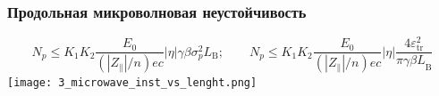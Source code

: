 \begin{frame}
	\frametitle{Продольная микроволновая неустойчивость}
	\begin{equation}
		N_p\le K_1K_2\frac{E_0}{\left(\left|Z_\parallel\right|/n\right)ec}\left|\eta\right|\gamma\beta\sigma_p^2L_{\textrm{B}};
		\quad \quad
		N_p\le K_1K_2\frac{E_0}{\left(\left|Z_\parallel\right|/n\right)ec}\left|\eta\right|\frac{4\varepsilon_{\text{tr}}^2}{{\pi\gamma\beta L}_{\textrm{B}}}
		\label{eq:microwave_instability_2}
	\end{equation}
	\centering
	\texttt{[image: 3\_microwave\_inst\_vs\_lenght.png]}
\end{frame}
